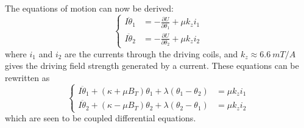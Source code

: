 \documentclass{article}
\begin{document}
The equations of motion can now be derived:
\begin{equation*}
    \begin{cases}
        I\ddot{\theta}_1 &= -\frac{\partial U}{\partial \theta_1} + \mu k_z i_1 \\
        I\ddot{\theta}_2 &= -\frac{\partial U}{\partial \theta_2} + \mu k_z i_2
    \end{cases}
\end{equation*}
where $i_1$ and $i_2$ are the currents through the driving coils, and $k_z \approx \qty{6.6}{mT/A}$ gives the driving field strength generated by a current. These equations can be rewritten as
\begin{equation*}
    \begin{cases}
        I\ddot{\theta}_1 + (\kappa + \mu B_T)\theta_1 + \lambda(\theta_1 - \theta_2) &= \mu k_z i_1\\
        I\ddot{\theta}_2 + (\kappa - \mu B_T)\theta_2 + \lambda(\theta_2 - \theta_1) &= \mu k_z i_2
    \end{cases}
\end{equation*}
which are seen to be coupled differential equations.
\end{document}
